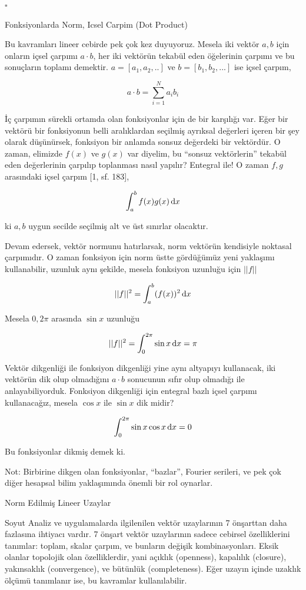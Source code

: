 \documentclass[12pt,fleqn]{article}\usepackage{../../common}
\begin{document}
$ \square $

Fonksiyonlarda Norm, Icsel Carpim (Dot Product)

Bu kavramları lineer cebirde pek çok kez duyuyoruz. Mesela iki vektör
$a,b$ için onların içsel çarpımı $a \cdot b$, her iki vektörün tekabül
eden öğelerinin çarpımı ve bu sonuçların toplamı demektir. $a = [a_1,a_2,..]$
ve $b = [b_1,b_2,...]$ ise içsel çarpım,

$$
a \cdot b = \sum_{i=1}^{N} a_i b_i 
$$

İç çarpımın sürekli ortamda olan fonksiyonlar için de bir karşılığı var.  Eğer
bir vektörü bir fonksiyonun belli aralıklardan seçilmiş ayrıksal değerleri
içeren bir şey olarak düşünürsek, fonksiyon bir anlamda sonsuz değerdeki bir
vektördür. O zaman, elimizde $f(x)$ ve $g(x)$ var diyelim, bu ``sonsuz
vektörlerin'' tekabül eden değerlerinin çarpılıp toplanması nasıl yapılır?
Entegral ile! O zaman $f,g$ arasındaki içsel çarpım [1, sf. 183],

$$
\int_{a}^{b} f(x) g(x) \,\mathrm{d} x
$$

ki $a,b$ uygun secilde seçilmiş alt ve üst sınırlar olacaktır. 

Devam edersek, vektör normunu hatırlarsak, norm vektörün kendisiyle noktasal
çarpımıdır. O zaman fonksiyon için norm üstte gördüğümüz yeni yaklaşımı
kullanabilir, uzunluk aynı şekilde, mesela fonksiyon uzunluğu için $||f||$

$$
||f||^2 = \int _{a}^{b} (f(x))^2 \,\mathrm{d} x
$$

Mesela $0,2\pi$ arasında $\sin x$ uzunluğu

$$
||f||^2 = \int _{0}^{2\pi} \sin x \,\mathrm{d} x = \pi
$$

Vektör dikgenliği ile fonksiyon dikgenliği yine aynı altyapıyı kullanacak, iki
vektörün dik olup olmadığını $a \cdot b$ sonucunun sıfır olup olmadığı ile
anlayabiliyorduk. Fonksiyon dikgenliği için entegral bazlı içsel çarpımı
kullanacağız, mesela $\cos x$ ile $\sin x$ dik midir?

$$
\int _{0}^{2\pi} \sin x \cos x \,\mathrm{d} x = 0
$$

Bu fonksiyonlar dikmiş demek ki.

Not: Birbirine dikgen olan fonksiyonlar, ``bazlar'', Fourier serileri, ve pek
çok diğer hesapsal bilim yaklaşımında önemli bir rol oynarlar.


Norm Edilmiş Lineer Uzaylar

Soyut Analiz ve uygulamalarda ilgilenilen vektör uzaylarının 7 önşarttan
daha fazlasına ihtiyacı vardır. 7 önşart vektör uzaylarının sadece cebirsel
özelliklerini tanımlar: toplam, skalar çarpım, ve bunların değişik
kombinasyonları. Eksik olanlar topolojik olan özelliklerdir, yani açıklık
(openness), kapalılık (closure), yakınsaklık (convergence), ve bütünlük
(completeness). Eğer uzayın içinde uzaklık ölçümü tanımlanır ise, bu
kavramlar kullanılabilir. 
\end{document}
